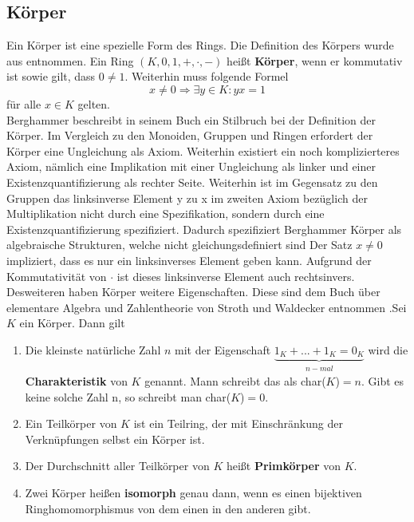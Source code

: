 \subsection{Körper} \label{sec:koerper}
Ein Körper ist eine spezielle Form des Rings. Die Definition des Körpers wurde aus \cite[S. 364-365]{Berghammer.2021} entnommen. Ein Ring $(K,0,1,+,\cdot,-)$ heißt \textbf{Körper}, wenn er kommutativ ist sowie gilt, dass $0 \neq 1$. Weiterhin muss folgende Formel $$x \neq 0 \Rightarrow \exists y \in K : yx = 1$$ für alle $x \in K$ gelten.\\

Berghammer beschreibt in seinem Buch ein Stilbruch bei der Definition der Körper. Im Vergleich zu den Monoiden, Gruppen und Ringen erfordert der Körper eine Ungleichung als Axiom. Weiterhin existiert ein noch komplizierteres Axiom, nämlich eine Implikation mit einer Ungleichung als linker und einer Existenzquantifizierung als rechter Seite. Weiterhin ist im Gegensatz zu den Gruppen das linksinverse Element y zu x im zweiten Axiom bezüglich der Multiplikation nicht durch eine Spezifikation, sondern durch eine Existenzquantifizierung spezifiziert. Dadurch spezifiziert Berghammer Körper als algebraische Strukturen, welche nicht gleichungsdefiniert sind \cite[S. 364-365]{Berghammer.2021} Der Satz $x \neq 0$ impliziert, dass es nur ein linksinverses Element geben kann. Aufgrund der Kommutativität von \glqq$\cdot$\grqq{} ist dieses linksinverse Element auch rechtsinvers.\\

Desweiteren haben Körper weitere Eigenschaften. Diese sind dem Buch über elementare Algebra und Zahlentheorie von Stroth und Waldecker entnommen \cite[S. 57-59]{Stroth.2019}.Sei $K$ ein Körper. Dann gilt
\begin{enumerate}
\item Die kleinste natürliche Zahl $n$ mit der Eigenschaft $\underbrace{1_{K} + ... + 1_{K} = 0_{K}}_{\substack{n-mal}}$ wird die \textbf{Charakteristik} von $K$ genannt. Mann schreibt das als char($K$)$ = n$. Gibt es keine solche Zahl n, so schreibt man char($K$)$ = 0$. 
\item Ein Teilkörper von $K$ ist ein Teilring, der mit Einschränkung der Verknüpfungen selbst ein Körper ist.
\item Der Durchschnitt aller Teilkörper von $K$ heißt  \textbf{Primkörper} von $K$.
\item Zwei Körper heißen  \textbf{isomorph} genau dann, wenn es einen bijektiven Ringhomomorphismus von dem einen in den anderen gibt.
\end{enumerate}

